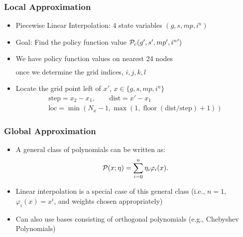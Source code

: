 \documentclass[11pt]{beamer}
\begin{document}

\begin{frame}\frametitle{Local Approximation}

\begin{itemize}\setlength{\itemsep}{8pt}
  \item Piecewise Linear Interpolation: 4 state variables $(g,s,mp,i^n)$
  \item Goal: Find the policy function value ${\cal{P}}_c(g',s',mp',{i^n}')$
  \item We have policy function values on nearest 24 nodes
  \begin{gather*}
   [{\cal{P}}_c(g_i,s_j,mp_k,i^n_l), {\cal{P}}_c(g_i,s_j,mp_k,i^n_{l+1}), {\cal{P}}_c(g_i,s_j,mp_{k+1},i^n_l), \\ \dots, {\cal{P}}_c(g_{i+1},s_{j+1},mp_{k+1},i^n_{l+1})]
  \end{gather*}
  once we determine the grid indices, $i,j,k,l$
  \item Locate the grid point left of $x'$, $x \in \{g,s,mp,i^n\}$ %
   \begin{gather*}
    \textrm{step} = x_2 - x_1, \qquad \textrm{dist} = x' - x_1\\
    \textrm{loc} = \min(N_x-1,\max(1,\operatorname{floor}(\textrm{dist}/\textrm{step}) + 1))
    \end{gather*}
\end{itemize}

\end{frame}


\begin{frame}\frametitle{Global Approximation}

\begin{itemize}\setlength{\itemsep}{10pt}
  \item A general class of polynomials can be written as:
  \begin{gather*}
  {\cal{P}}(x;\eta) = \sum_{i=0}^n\eta_i\varphi_i(x).
  \end{gather*}
  \item Linear interpolation is a special case of this general class (i.e., $n=1$, $\varphi_i(x)=x^i$, and weights chosen appropriately)
  \item Can also use bases consisting of orthogonal polynomials (e.g., Chebyshev Polynomials)
\end{itemize}

\end{frame}
\end{document}
